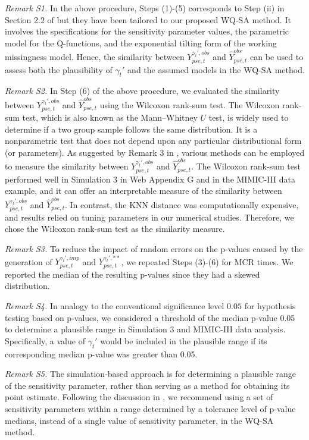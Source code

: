 \documentclass[12pt]{article}
\begin{document}
  {\em Remark S1.} In the above procedure, Steps (1)-(5) corresponds to Step (ii) in Section 2.2 of \cite{yin2019simulation} but they have been tailored to our proposed WQ-SA method. It involves the specifications for the sensitivity parameter values, the parametric model for the Q-functions, and the exponential tilting form of the working missingness model. Hence, the similarity between $Y_{pse,t}^{\gamma_t',obs}$ and $\widehat{Y}_{pse,t}^{obs}$ can be used to assess both the plausibility of $\gamma_t'$ and the assumed models in the WQ-SA method.     

 {\em Remark S2.} In Step (6) of the above procedure, we evaluated the similarity between $Y_{pse,t}^{\gamma_t',obs}$ and $\widehat{Y}_{pse,t}^{obs}$ using the Wilcoxon rank-sum test. The Wilcoxon rank-sum test, which is also known as the Mann–Whitney $U$ test, is widely used to determine if 
 a two group sample follows the same distribution. It is a nonparametric test that does not depend upon any particular distributional form (or parameters). As suggested by  Remark 3 in \cite{yin2019simulation}, various methods can be employed to measure the similarity between $Y_{pse,t}^{\gamma_t',obs}$ and $\widehat{Y}_{pse,t}^{obs}$. The Wilcoxon rank-sum test performed well in Simulation 3 in Web Appendix G and in  the MIMIC-III data example,  and it can offer an interpretable measure of the similarity between $Y_{pse,t}^{\gamma_t',obs}$ and $\widehat{Y}_{pse,t}^{obs}$. In contrast,  the KNN distance was computationally expensive, and results relied on tuning parameters in our numerical studies. Therefore, we chose  the Wilcoxon rank-sum test as the similarity measure. 
 
 {\em Remark S3.} To reduce the impact of random errors on the p-values caused by the generation of $Y_{pse,t}^{\gamma_t',imp}$ and $Y_{pse,t}^{\gamma_t',**}$, we repeated Steps (3)-(6) for MCR times. We reported the median of the resulting p-values since they had a skewed distribution.   


 {\em Remark S4.} In analogy to the conventional significance level $0.05$ for hypothesis testing based on p-values, we considered a threshold of the median p-value  0.05 to determine a plausible range in Simulation 3 and MIMIC-III data analysis. Specifically, a value of $\gamma_t'$  would be included in the plausible range if its corresponding  median p-value was greater than 0.05.

 {\em Remark S5.} The simulation-based approach is for determining a plausible range of the sensitivity parameter, rather than serving as a method for obtaining its point estimate. Following the discussion in \cite{yin2019simulation}, we recommend using a set of sensitivity parameters within a range determined by a tolerance level of p-value medians,  instead of a single value of sensitivity parameter,  in the WQ-SA method.
\end{document}
